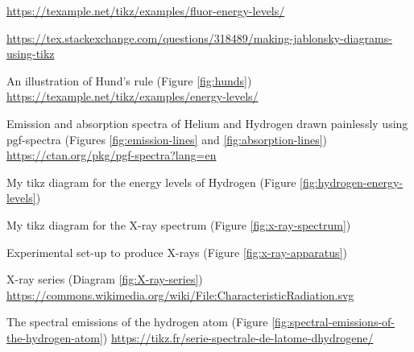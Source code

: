 \documentclass[oneside]{book}
\begin{document}
\begin{enumerate}[label={[\arabic*]}]
    \url{https://texample.net/tikz/examples/fluor-energy-levels/}

    \url{https://tex.stackexchange.com/questions/318489/making-jablonsky-diagrams-using-tikz}
    \item\label{source:hunds} An illustration of Hund's rule (Figure \ref{fig:hunds}) \url{https://texample.net/tikz/examples/energy-levels/}
    \item\label{source:emission-and-absorption-lines} Emission and absorption spectra of Helium and Hydrogen drawn painlessly using pgf-spectra (Figures \ref{fig:emission-lines} and \ref{fig:absorption-lines}) \url{https://ctan.org/pkg/pgf-spectra?lang=en} 
    \item\label{source:hydrogen-energy-levels} My tikz diagram for the energy levels of Hydrogen (Figure \ref{fig:hydrogen-energy-levels})
    \item\label{source:x-ray-spectrum} My tikz diagram for the X-ray spectrum (Figure \ref{fig:x-ray-spectrum})
    \item\label{source:x-ray-apparatus} Experimental set-up to produce X-rays (Figure \ref{fig:x-ray-apparatus})
    \item\label{source:X-ray-series} X-ray series (Diagram \ref{fig:X-ray-series}) \url{https://commons.wikimedia.org/wiki/File:CharacteristicRadiation.svg}
    \item\label{source:spectral-emissions-of-the-hydrogen-atom} The spectral emissions of the hydrogen atom (Figure \ref{fig:spectral-emissions-of-the-hydrogen-atom}) \url{https://tikz.fr/serie-spectrale-de-latome-dhydrogene/} 
\end{enumerate}
\end{document}
